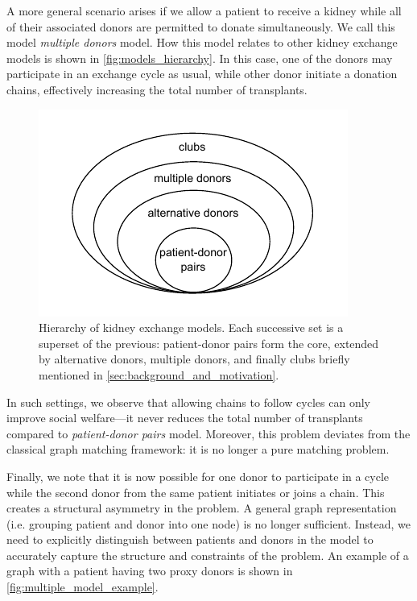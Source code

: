 A more general scenario arises if we allow a patient to receive a kidney while all of their associated donors are permitted to donate simultaneously. We call this model \textit{multiple donors} model. How this model relates to other kidney exchange models is shown in \autoref{fig:models_hierarchy}. In this case, one of the donors may participate in an exchange cycle as usual, while other donor initiate a donation chains, effectively increasing the total number of transplants.




\begin{figure}
    \centering
    \includegraphics{data/models_hierarchy.pdf}
    \caption[Hierarchy of kidney exchange models]{Hierarchy of kidney exchange models. Each successive set is a superset of the previous: patient-donor pairs form the core, extended by alternative donors, multiple donors, and finally clubs briefly mentioned in \autoref{sec:background_and_motivation}.}
    \label{fig:models_hierarchy}
\end{figure}

In such settings, we observe that allowing chains to follow cycles can only improve social welfare—it never reduces the total number of transplants compared to \textit{patient-donor pairs} model. Moreover, this problem deviates from the classical graph matching framework: it is no longer a pure matching problem.

Finally, we note that it is now possible for one donor to participate in a cycle while the second donor from the same patient initiates or joins a chain. This creates a structural asymmetry in the problem. A general graph representation (i.e. grouping patient and donor into one node) is no longer sufficient. Instead, we need to explicitly distinguish between patients and donors in the model to accurately capture the structure and constraints of the problem. An example of a graph with a patient having two proxy donors is shown in \autoref{fig:multiple_model_example}.

